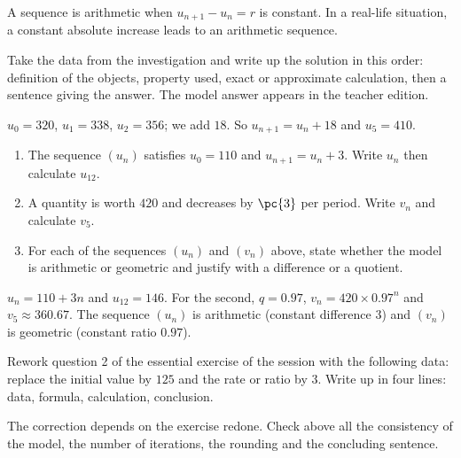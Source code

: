    \begin{summary}A sequence is arithmetic when $u_{n+1}-u_n=r$ is constant. In a real-life situation, a constant absolute increase leads to an arithmetic sequence.\end{summary}

    \begin{example}
    Take the data from the investigation and write up the solution in this order: definition of the objects, property used, exact or approximate calculation, then a sentence giving the answer. The model answer appears in the teacher edition.
    \end{example}
    \begin{solution}$u_0=320$, $u_1=338$, $u_2=356$; we add $18$. So $u_{n+1}=u_n+18$ and $u_5=410$.\end{solution}

    \begin{exercise}[essential]
    \begin{enumerate}\item The sequence $(u_n)$ satisfies $u_0=110$ and $u_{n+1}=u_n+3$. Write $u_n$ then calculate $u_{12}$.\item A quantity is worth $420$ and decreases by $\pc{3}$ per period. Write $v_n$ and calculate $v_5$.\item For each of the sequences $(u_n)$ and $(v_n)$ above, state whether the model is arithmetic or geometric and justify with a difference or a quotient.\end{enumerate}
    \end{exercise}
    \begin{solution}$u_n=110+3n$ and $u_{12}=146$. For the second, $q=\num{0,97}$, $v_n=420\times\num{0,97}^n$ and $v_5\approx\num{360,67}$. The sequence $(u_n)$ is arithmetic (constant difference $3$) and $(v_n)$ is geometric (constant ratio $\num{0,97}$).\end{solution}


    \begin{homework}Rework question 2 of the essential exercise of the session with the following data: replace the initial value by $125$ and the rate or ratio by $3$. Write up in four lines: data, formula, calculation, conclusion.\end{homework}
    \begin{solution}The correction depends on the exercise redone. Check above all the consistency of the model, the number of iterations, the rounding and the concluding sentence.\end{solution}

